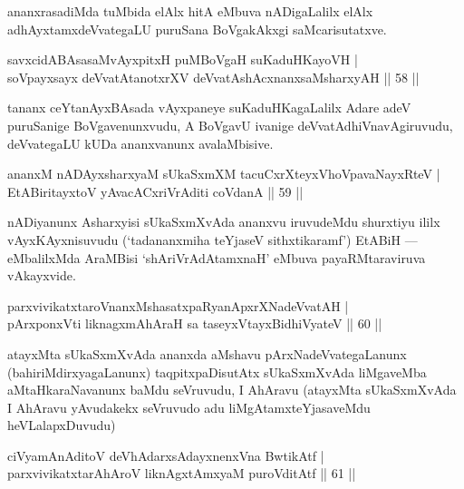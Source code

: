 \begin{artha}
ananxrasadiMda tuMbida elAlx hitA eMbuva nADigaLalilx elAlx adhAyxtamxdeVvategaLU puruSana BoVgakAkxgi saMcarisutatxve.
\end{artha}


\begin{shl}
savxcidABAsasaMvAyxpitxH puMBoVgaH suKaduHKayoVH |\\
soV\s payxsayx deVvatAtanotxrXV deVvatAshAcxnanxsaMsharxyAH \hfill || 58 || 
\end{shl}

\begin{artha}
tananx ceYtanAyxBAsada vAyxpaneye suKaduHKagaLalilx Adare adeV puruSanige BoVgavenunxvudu, A BoVgavU ivanige deVvatAdhiVnavAgiruvudu, deVvategaLU kUDa ananxvanunx avalaMbisive.
\end{artha}

\begin{shl}
ananxM nADAyxsharxyaM sUkaSxmXM tacuCxrXteyxVhoVpavaNayxRteV |\\
EtABiritayxtoV yAvacACxriVrAditi coVdanA \hfill || 59 || 
\end{shl}

\begin{artha}
nADiyanunx Asharxyisi sUkaSxmXvAda ananxvu iruvudeMdu shurxtiyu ililx vAyxKAyxnisuvudu (`tadananxmiha teYjaseV sithxtikaramf') EtABiH --- eMbalilxMda AraMBisi `shAriVrAdAtamxnaH' eMbuva payaRMtaraviruva vAkayxvide.
\end{artha}

\begin{shl}
parxvivikatxtaroV\s nanxMshasatxpaRyanApxrXNadeVvatAH |\\
pArxponxVti liknagxmAhAraH sa taseyxVtayxBidhiVyateV \hfill || 60 || 
\end{shl}

\begin{artha}
atayxMta sUkaSxmXvAda ananxda aMshavu pArxNadeVvategaLanunx (bahiriMdirxyagaLanunx) taqpitxpaDisutAtx sUkaSxmXvAda liMgaveMba aMtaHkaraNavanunx baMdu seVruvudu, I AhAravu (atayxMta sUkaSxmXvAda I AhAravu yAvudakekx seVruvudo adu liMgAtamxteYjasaveMdu heVLalapxDuvudu)
\end{artha}

\begin{shl}
ciVyamAnAditoV deVhAdarxsAdayxnenxVna BwtikAtf |\\
parxvivikatxtarAhAroV liknAgxtAmx\s yaM puroVditAtf \hfill || 61 || 
\end{shl}

